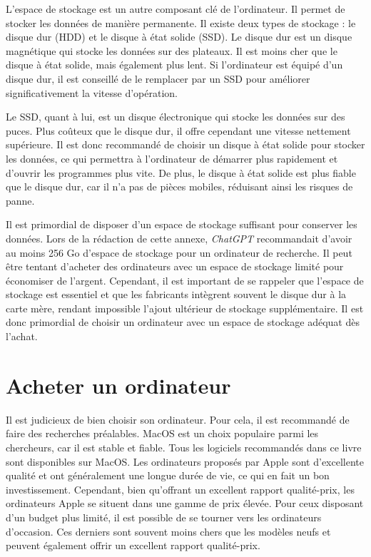 \documentclass[
  letterpaper,
  DIV=11,
  numbers=noendperiod,
  oneside]{scrreprt}
\begin{document}
L'espace de stockage est un autre composant clé de l'ordinateur. Il
permet de stocker les données de manière permanente. Il existe deux
types de stockage : le disque dur (HDD) et le disque à état solide
(SSD). Le disque dur est un disque magnétique qui stocke les données sur
des plateaux. Il est moins cher que le disque à état solide, mais
également plus lent. Si l'ordinateur est équipé d'un disque dur, il est
conseillé de le remplacer par un SSD pour améliorer significativement la
vitesse d'opération.

Le SSD, quant à lui, est un disque électronique qui stocke les données
sur des puces. Plus coûteux que le disque dur, il offre cependant une
vitesse nettement supérieure. Il est donc recommandé de choisir un
disque à état solide pour stocker les données, ce qui permettra à
l'ordinateur de démarrer plus rapidement et d'ouvrir les programmes plus
vite. De plus, le disque à état solide est plus fiable que le disque
dur, car il n'a pas de pièces mobiles, réduisant ainsi les risques de
panne.

Il est primordial de disposer d'un espace de stockage suffisant pour
conserver les données. Lors de la rédaction de cette annexe,
\emph{ChatGPT} recommandait d'avoir au moins 256 Go d'espace de stockage
pour un ordinateur de recherche. Il peut être tentant d'acheter des
ordinateurs avec un espace de stockage limité pour économiser de
l'argent. Cependant, il est important de se rappeler que l'espace de
stockage est essentiel et que les fabricants intègrent souvent le disque
dur à la carte mère, rendant impossible l'ajout ultérieur de stockage
supplémentaire. Il est donc primordial de choisir un ordinateur avec un
espace de stockage adéquat dès l'achat.

\hypertarget{acheter-un-ordinateur}{%
\section{Acheter un ordinateur}\label{acheter-un-ordinateur}}

Il est judicieux de bien choisir son ordinateur. Pour cela, il est
recommandé de faire des recherches préalables. MacOS est un choix
populaire parmi les chercheurs, car il est stable et fiable. Tous les
logiciels recommandés dans ce livre sont disponibles sur MacOS. Les
ordinateurs proposés par Apple sont d'excellente qualité et ont
généralement une longue durée de vie, ce qui en fait un bon
investissement. Cependant, bien qu'offrant un excellent rapport
qualité-prix, les ordinateurs Apple se situent dans une gamme de prix
élevée. Pour ceux disposant d'un budget plus limité, il est possible de
se tourner vers les ordinateurs d'occasion. Ces derniers sont souvent
moins chers que les modèles neufs et peuvent également offrir un
excellent rapport qualité-prix.
\end{document}
